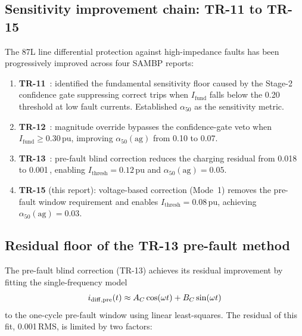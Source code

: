 \documentclass[11pt,a4paper]{article}
\newcommand{\Ifund}{I_{\mathrm{fund}}}
\newcommand{\alphafifty}{\alpha_{50}}
\newcommand{\pu}{\,\text{pu}}
\begin{document}
\subsection{Sensitivity improvement chain: TR-11 to TR-15}

The 87L line differential protection against high-impedance faults has been
progressively improved across four SAMBP reports:

\begin{enumerate}
  \item \textbf{TR-11}~\cite{SAMBP_TR11}: identified the fundamental
        sensitivity floor caused by the Stage-2 confidence gate suppressing
        correct trips when $\Ifund$ falls below the 0.20\pu threshold at low
        fault currents.  Established $\alphafifty$ as the sensitivity metric.

  \item \textbf{TR-12}~\cite{SAMBP_TR12}: magnitude override bypasses the
        confidence-gate veto when $\Ifund \geq 0.30\pu$, improving
        $\alphafifty(\mathrm{ag})$ from 0.10 to 0.07.

  \item \textbf{TR-13}~\cite{SAMBP_TR13}: pre-fault blind correction reduces
        the charging residual from 0.018\pu to 0.001\pu, enabling
        $I_{\mathrm{thresh}} = 0.12\pu$ and $\alphafifty(\mathrm{ag}) = 0.05$.

  \item \textbf{TR-15} (this report): voltage-based correction (Mode~1)
        removes the pre-fault window requirement and enables
        $I_{\mathrm{thresh}} = 0.08\pu$, achieving $\alphafifty(\mathrm{ag}) = 0.03$.
\end{enumerate}

\subsection{Residual floor of the TR-13 pre-fault method}

The pre-fault blind correction (TR-13) achieves its residual improvement by
fitting the single-frequency model
\begin{equation}
  i_{\rm diff,pre}(t) \approx A_C \cos(\omega t) + B_C \sin(\omega t)
  \label{eq:prefault_fit}
\end{equation}
to the one-cycle pre-fault window using linear least-squares.  The residual
of this fit, 0.001\pu RMS, is limited by two factors:
\end{document}

